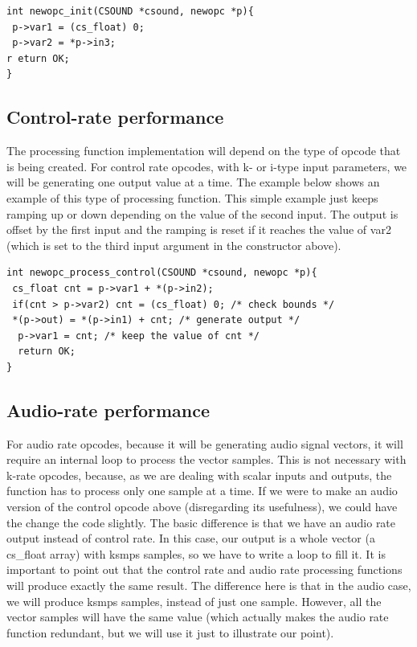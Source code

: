 \documentclass[11pt]{article}
\begin{document}
\begin{lstlisting}
int newopc_init(CSOUND *csound, newopc *p){
 p->var1 = (cs_float) 0;
 p->var2 = *p->in3;
r eturn OK;
}
\end{lstlisting}

\subsection{Control-rate performance}

The processing function implementation will depend on the type of opcode that is being created. For control rate opcodes, with k- or i-type input parameters, we will be generating one output value at a time. The example below shows an example of this type of processing function. This simple example just keeps ramping up or down depending on the value of the second input. The output is offset by the first input and the ramping is reset if it reaches the value of var2 (which is set to the third input argument in the constructor above). 

\begin{lstlisting}
int newopc_process_control(CSOUND *csound, newopc *p){
 cs_float cnt = p->var1 + *(p->in2);
 if(cnt > p->var2) cnt = (cs_float) 0; /* check bounds */
 *(p->out) = *(p->in1) + cnt; /* generate output */
  p->var1 = cnt; /* keep the value of cnt */
  return OK;
}
\end{lstlisting}

\subsection{Audio-rate performance}

For audio rate opcodes, because it will be generating audio signal vectors, it will require an internal loop to process the vector samples. This is not necessary with k-rate opcodes, because, as we are dealing with scalar inputs and outputs,  the function has to process only one sample at a time. If we were to make an audio version of the control opcode above (disregarding its usefulness), we could have the change the code slightly. The basic difference is that we have an audio rate output instead of control rate. In this case, our output is a whole vector (a cs_float array) with ksmps samples, so we have to write a loop to fill it. It is important to point out that the control rate and audio rate processing functions will produce exactly the same result. The difference here is that in the audio case, we will produce ksmps samples, instead of just one  sample. However, all the vector samples will have the same value (which actually makes the audio rate function redundant, but we will use it just to illustrate our point).
\end{document}
